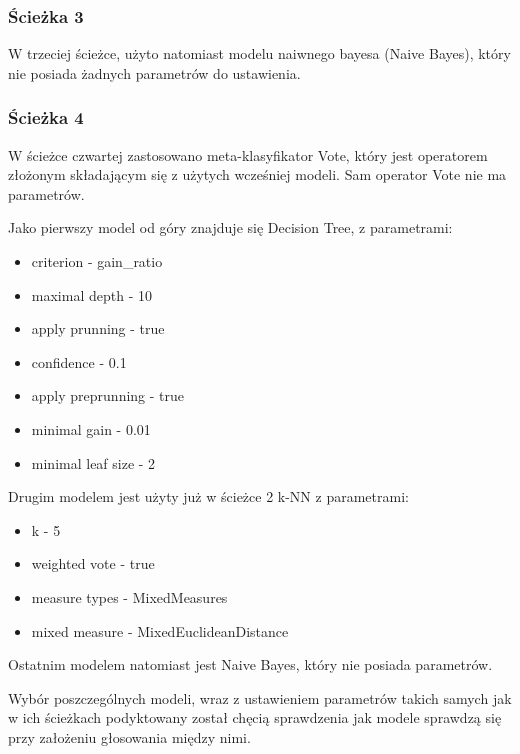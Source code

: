 \documentclass[12pt,oneside,a4paper]{book} %
\theoremstyle{break}
\begin{document}
\subsubsection*{Ścieżka 3}

W trzeciej ścieżce, użyto natomiast modelu naiwnego bayesa (Naive Bayes), który nie posiada żadnych parametrów do ustawienia.

\subsubsection*{Ścieżka 4}

W ścieżce czwartej zastosowano meta-klasyfikator Vote, który jest operatorem złożonym składającym się z użytych wcześniej modeli.
Sam operator Vote nie ma parametrów.

Jako pierwszy model od góry znajduje się Decision Tree, z parametrami:
\begin{itemize}
  \item criterion - gain\_ratio
  \item maximal depth - 10
  \item apply prunning - true
  \item confidence - 0.1
  \item apply preprunning - true
  \item minimal gain - 0.01
  \item minimal leaf size - 2
\end{itemize}

Drugim modelem jest użyty już w ścieżce 2 k-NN z parametrami:
\begin{itemize}
  \item k - 5
  \item weighted vote - true
  \item measure types - MixedMeasures
  \item mixed measure - MixedEuclideanDistance
\end{itemize}

Ostatnim modelem natomiast jest Naive Bayes, który nie posiada parametrów.

Wybór poszczególnych modeli, wraz z ustawieniem parametrów takich samych jak w ich ścieżkach podyktowany został chęcią sprawdzenia jak modele sprawdzą się przy założeniu głosowania między nimi.
\end{document}
